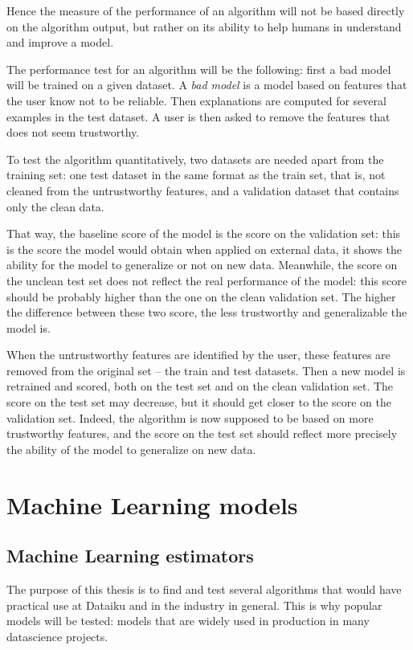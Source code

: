 \documentclass[a4paper,11pt]{kth-mag}
\begin{document}
Hence the measure of the performance of an algorithm will not be based directly on the algorithm output, but rather on its ability to help humans in understand and improve a model.

The performance test for an algorithm will be the following: first a bad model will be trained on a given dataset. A \textit{bad model} is a model based on features that the user know not to be reliable. Then explanations are computed for several examples in the test dataset. A user is then asked to remove the features that does not seem trustworthy.

To test the algorithm quantitatively, two datasets are needed apart from the training set: one test dataset in the same format as the train set, that is, not cleaned from the untrustworthy features, and a validation dataset that contains only the clean data.

That way, the baseline score of the model is the score on the validation set: this is the score the model would obtain when applied on external data, it shows the ability for the model to generalize or not on new data. Meanwhile, the score on the unclean test set does not reflect the real performance of the model: this score should be probably higher than the one on the clean validation set. The higher the difference between these two score, the less trustworthy and generalizable the model is.

When the untrustworthy features are identified by the user, these features are removed from the original set -- the train and test datasets. Then a new model is retrained and scored, both on the test set and on the clean validation set. The score on the test set may decrease, but it should get closer to the score on the validation set. Indeed, the algorithm is now supposed to be based on more trustworthy features, and the score on the test set should reflect more precisely the ability of the model to generalize on new data.

\section{Machine Learning models}

\subsection{Machine Learning estimators}

The purpose of this thesis is to find and test several algorithms that would have practical use at Dataiku and in the industry in general. This is why popular models will be tested: models that are widely used in production in many datascience projects.
\end{document}
